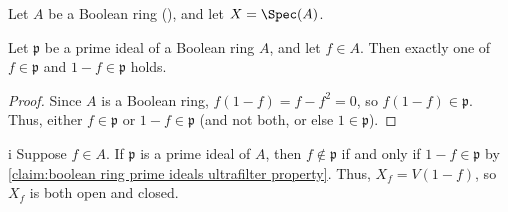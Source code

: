 \begin{exercise}
Let \(A\) be a Boolean ring (), and let \(X = \Spec(A)\).
\end{exercise}

\begin{claim}
\label{claim:boolean ring prime ideals ultrafilter property}
Let \(\mathfrak{p}\) be a prime ideal of a Boolean ring \(A\), and let \(f \in A\).
Then exactly one of \(f \in \mathfrak{p}\) and \(1 - f \in \mathfrak{p}\) holds.
\end{claim}

\begin{proof}
Since \(A\) is a Boolean ring, \(f(1 - f) = f - f^2 = 0\), so \(f(1 - f) \in \mathfrak{p}\).
Thus, either \(f \in \mathfrak{p}\) or \(1 - f \in \mathfrak{p}\) (and not both, or else \(1 \in \mathfrak{p}\)).
\end{proof}

\begin{partsolution}{i}
Suppose \(f \in A\).
If \(\mathfrak{p}\) is a prime ideal of \(A\), then \(f \notin \mathfrak{p}\) if and only if \(1 - f \in \mathfrak{p}\) by \autoref{claim:boolean ring prime ideals ultrafilter property}.
Thus, \(X_f = V(1 - f)\), so \(X_f\) is both open and closed.
\end{partsolution}

